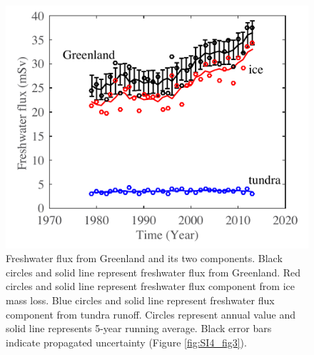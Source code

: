 \clearpage
\begin{figure}
	\centering
	\includegraphics{figs_app/FigS11.pdf}
	\caption[Freshwater flux from Greenland and its two components.]{Freshwater flux from Greenland and its two components.  Black circles and solid line represent freshwater flux from Greenland.  Red circles and solid line represent freshwater flux component from ice mass loss.  Blue circles and solid line represent freshwater flux component from tundra runoff.  Circles represent annual value and solid line represents 5-year running average.  Black error bars indicate propagated uncertainty (Figure \ref{fig:SI4_fig3}).}
	\label{fig:SI4_fig11}
\end{figure}

